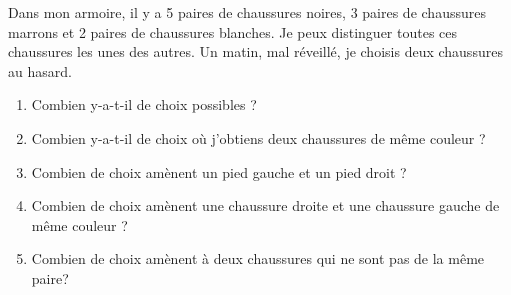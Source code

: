 \documentclass[../PolyS4.tex]{subfiles}
\begin{document}


\vskip0.2cm
Dans mon armoire, il y a 5 paires de chaussures noires, 3 paires de chaussures marrons et 2 paires de chaussures blanches. Je peux distinguer toutes ces chaussures les unes des autres. Un matin, mal réveillé, je choisis deux chaussures au hasard.
\begin{enumerate}
\item Combien y-a-t-il de choix possibles ?
\item Combien y-a-t-il de choix où j'obtiens deux chaussures de même couleur ?
\item Combien de choix amènent un pied gauche et un pied droit ?
\item Combien de choix amènent une chaussure droite et une chaussure gauche de même couleur ?
\item Combien de choix amènent à deux chaussures qui ne sont pas de la même paire?\\
\end{enumerate}








\end{document}

